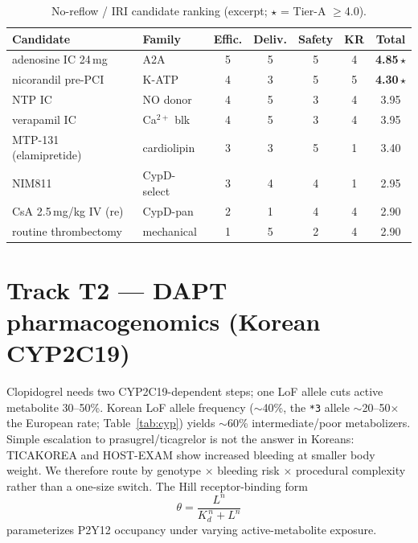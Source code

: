 \documentclass[11pt]{article}
\begin{document}
\begin{table}[h]
\centering
\caption{No-reflow / IRI candidate ranking (excerpt; $\star$ = Tier-A $\geq$4.0).}
\label{tab:noreflow}
\begin{tabular}{llccccc}
\toprule
Candidate & Family & Effic. & Deliv. & Safety & KR & Total \\
\midrule
adenosine IC 24\,mg     & A2A          & 5 & 5 & 5 & 4 & \textbf{4.85}\,$\star$ \\
nicorandil pre-PCI      & K-ATP        & 4 & 3 & 5 & 5 & \textbf{4.30}\,$\star$ \\
NTP IC                  & NO donor     & 4 & 5 & 3 & 4 & 3.95 \\
verapamil IC            & Ca$^{2+}$ blk & 4 & 5 & 3 & 4 & 3.95 \\
MTP-131 (elamipretide)  & cardiolipin  & 3 & 3 & 5 & 1 & 3.40 \\
NIM811                  & CypD-select  & 3 & 4 & 4 & 1 & 2.95 \\
CsA 2.5\,mg/kg IV (re)  & CypD-pan     & 2 & 1 & 4 & 4 & 2.90 \\
routine thrombectomy    & mechanical   & 1 & 5 & 2 & 4 & 2.90 \\
\bottomrule
\end{tabular}
\end{table}

\section{Track T2 --- DAPT pharmacogenomics (Korean CYP2C19)}
\label{sec:daptpgx}

Clopidogrel needs two CYP2C19-dependent steps; one LoF allele cuts active metabolite 30--50\%. Korean LoF allele frequency ($\sim$40\%, the \texttt{*3} allele $\sim$20--50$\times$ the European rate; Table~\ref{tab:cyp}) yields $\sim$60\% intermediate/poor metabolizers. Simple escalation to prasugrel/ticagrelor is not the answer in Koreans: TICAKOREA and HOST-EXAM show increased bleeding at smaller body weight. We therefore route by genotype $\times$ bleeding risk $\times$ procedural complexity rather than a one-size switch. The Hill receptor-binding form
\begin{equation}
\theta = \frac{L^{n}}{K_d^{\,n} + L^{n}}
\label{eq:hill}
\end{equation}
parameterizes P2Y12 occupancy under varying active-metabolite exposure.
\end{document}
